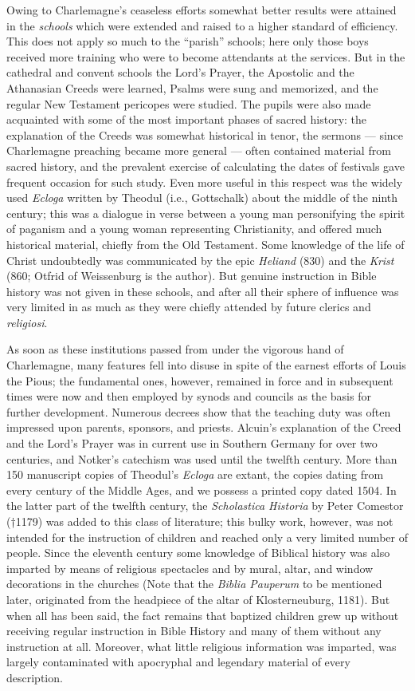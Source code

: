 Owing to Charlemagne’s ceaseless efforts somewhat better results were attained in the \emph{schools} which were extended and raised to a higher standard of efficiency. This does not apply so much to the “parish” schools; here only those boys received more training who were to become attendants at the services. But in the cathedral and convent schools the Lord’s Prayer, the Apostolic and the Athanasian Creeds were learned, Psalms were sung and memorized, and the regular New Testament pericopes were studied. The pupils were also made acquainted with some of the most important phases of sacred history: the explanation of the Creeds was somewhat historical in tenor, the sermons — since Charlemagne preaching became more general — often contained material from sacred history, and the prevalent exercise of calculating the dates of festivals gave frequent occasion for such study. Even more useful in this respect was the widely used \emph{Ecloga} written by Theodul (i.e., Gottschalk) about the middle of the ninth century; this was a dialogue in verse between a young man personifying the spirit of paganism and a young woman representing Christianity, and offered much historical material, chiefly from the Old Testament. Some knowledge of the life of Christ undoubtedly was communicated by the epic \emph{Heliand} (830) and the \emph{Krist} (860; Otfrid of Weissenburg is the author). But genuine instruction in Bible history was not given in these schools, and after all their sphere of influence was very limited in as much as they were chiefly attended by future clerics and \emph{religiosi}.

As soon as these institutions passed from under the
vigorous hand of Charlemagne, many features fell into disuse in spite of the earnest efforts of Louis the Pious; the fundamental ones, however, remained in force and in subsequent times were now and then employed by synods and councils as the basis for further development. Numerous decrees show that the teaching duty was often impressed upon parents, sponsors, and priests. Alcuin’s explanation of the Creed and the Lord’s Prayer was in current use in Southern Germany for over two centuries, and Notker’s catechism was used until the twelfth century. More than 150 manuscript copies of Theodul’s \emph{Ecloga} are extant, the copies dating from every century of the Middle Ages, and we possess a printed copy dated 1504. In the latter part of the twelfth century, the \emph{Scholastica Historia} by Peter Comestor (†1179) was added to this class of literature; this bulky work, however, was not intended for the instruction of children and reached only a very limited number of people. Since the eleventh century some knowledge of Biblical history was also imparted by means of religious spectacles and by mural, altar, and window decorations in the churches (Note that the \emph{Biblia Pauperum} to be mentioned later, originated from the headpiece of the altar of Klosterneuburg, 1181). But when all has been said, the fact remains that baptized children grew up without receiving regular instruction in Bible History and many of them without any instruction at all. Moreover, what little religious information was imparted, was largely contaminated with apocryphal and legendary material of every description.

